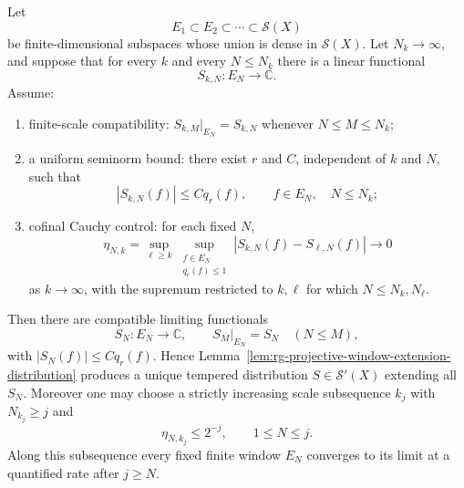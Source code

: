 \begin{lemma}
\label{lem:rg-cofinal-finite-window-assembly}
Let
\[
  E_1\subset E_2\subset\cdots\subset\mathcal S(X)
\]
be finite-dimensional subspaces whose union is dense in \(\mathcal S(X)\).
Let \(N_k\to\infty\), and suppose that for every \(k\) and every
\(N\le N_k\) there is a linear functional
\[
  S_{k,N}:E_N\to\mathbb C .
\]
Assume:
\begin{enumerate}
  \item finite-scale compatibility:
  \(S_{k,M}|_{E_N}=S_{k,N}\) whenever \(N\le M\le N_k\);
  \item a uniform seminorm bound: there exist \(r\) and \(C\), independent of
  \(k\) and \(N\), such that
  \[
    |S_{k,N}(f)|\le C q_r(f),
    \qquad f\in E_N,\quad N\le N_k;
  \]
  \item cofinal Cauchy control: for each fixed \(N\),
  \begin{equation}
    \eta_{N,k}
    =
    \sup_{\ell\ge k}
    \sup_{\substack{f\in E_N\\ q_r(f)\le1}}
    |S_{k,N}(f)-S_{\ell,N}(f)|
    \longrightarrow0
    \label{eq:cofinal-window-cauchy-control}
  \end{equation}
  as \(k\to\infty\), with the supremum restricted to
  \(k,\ell\) for which \(N\le N_k,N_\ell\).
\end{enumerate}
Then there are compatible limiting functionals
\[
  S_N:E_N\to\mathbb C,\qquad S_M|_{E_N}=S_N\quad(N\le M),
\]
with \(|S_N(f)|\le Cq_r(f)\).  Hence
Lemma~\ref{lem:rg-projective-window-extension-distribution} produces a unique
tempered distribution \(S\in\mathcal S'(X)\) extending all \(S_N\).
Moreover one may choose a strictly increasing scale subsequence \(k_j\) with
\(N_{k_j}\ge j\) and
\begin{equation}
  \eta_{N,k_j}\le 2^{-j},
  \qquad 1\le N\le j .
  \label{eq:cofinal-diagonal-window-schedule}
\end{equation}
Along this subsequence every fixed finite window \(E_N\) converges to its
limit at a quantified rate after \(j\ge N\).
\end{lemma}

